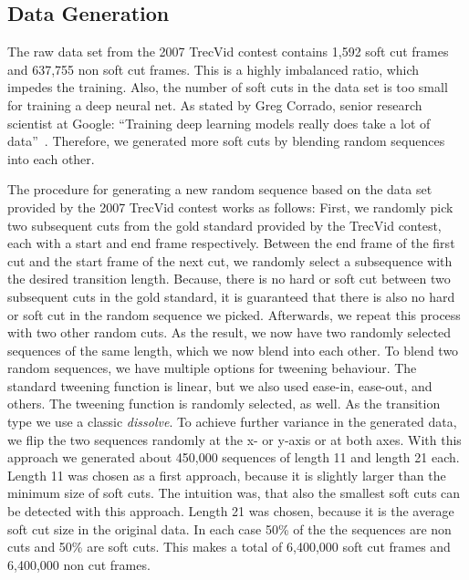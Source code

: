 \subsection{Data Generation}
\label{sec:soft_cut_data_generation}

The raw data set from the 2007 TrecVid contest contains 1,592 soft cut frames and 637,755 non soft cut frames.
This is a highly imbalanced ratio, which impedes the training.
Also, the number of soft cuts in the data set is too small for training a deep neural net.
As stated by Greg Corrado, senior research scientist at Google: ``Training deep learning models really does take a lot of data''~\cite{dataDeepNeuralNets}.
Therefore, we generated more soft cuts by blending random sequences into each other.

The procedure for generating a new random sequence based on the data set provided by the 2007 TrecVid contest works as follows:
First, we randomly pick two subsequent cuts from the gold standard provided by the TrecVid contest, each with a start and end frame respectively.
Between the end frame of the first cut and the start frame of the next cut, we randomly select a subsequence with the desired transition length.
Because, there is no hard or soft cut between two subsequent cuts in the gold standard, it is guaranteed that there is also no hard or soft cut in the random sequence we picked.
Afterwards, we repeat this process with two other random cuts.
As the result, we now have two randomly selected sequences of the same length, which we now blend into each other.
To blend two random sequences, we have multiple options for tweening behaviour.
The standard tweening function is linear, but we also used ease-in, ease-out, and others.
The tweening function is randomly selected, as well.
As the transition type we use a classic \textit{dissolve}.
To achieve further variance in the generated data, we flip the two sequences randomly at the x- or y-axis or at both axes.
With this approach we generated about 450,000 sequences of length 11 and length 21 each.
Length 11 was chosen as a first approach, because it is slightly larger than the minimum size of soft cuts.
The intuition was, that also the smallest soft cuts can be detected with this approach.
Length 21 was chosen, because it is the average soft cut size in the original data.
In each case 50\% of the the sequences are non cuts and 50\% are soft cuts.
This makes a total of 6,400,000 soft cut frames and 6,400,000 non cut frames.
